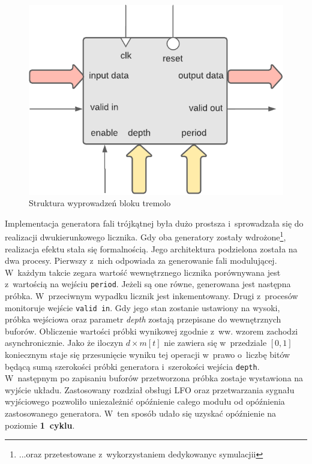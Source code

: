 \vspace{0.5cm}
\begin{figure}[ht]
    \centering
    \includegraphics[scale=0.75]{img/diagrams/tremolo.pdf}
    \captionsetup{format=plain,justification=centering}
    \caption{Struktura wyprowadzeń bloku tremolo}
    \label{tremolo-structure}
\end{figure}
\vspace{0.5cm}

Implementacja generatora fali trójkątnej była dużo prostsza i~sprowadzała się do realizacji dwukierunkowego licznika. Gdy oba generatory zostały wdrożone\footnote{...oraz przetestowane z~wykorzystaniem dedykowanyc symulacjii}, realizacja efektu stała się formalnością. Jego architektura podzielona została na dwa procesy. Pierwszy z~nich odpowiada za generowanie fali modulującej. W~każdym takcie zegara wartość wewnętrznego licznika porównywana jest z~wartością na wejściu \verb|period|. Jeżeli są one równe, generowana jest następna próbka. W~przeciwnym wypadku licznik jest inkementowany. Drugi z~procesów monitoruje wejście \verb|valid in|. Gdy jego stan zostanie ustawiony na wysoki, próbka wejściowa oraz parametr \textit{depth} zostają przepisane do wewnętrznych buforów. Obliczenie wartości próbki wynikowej zgodnie z~ww. wzorem zachodzi asynchronicznie. Jako że iloczyn $d \times m[t]$ nie zawiera się w~przedziale $[0,1]$ koniecznym staje się przesunięcie wyniku tej operacji w~prawo o~liczbę bitów będącą sumą szerokości próbki generatora i~szerokości wejścia \verb|depth|. W~następnym po zapisaniu buforów przetworzona próbka zostaje wystawiona na wyjście układu. Zastosowany rozdział obsługi LFO oraz przetwarzania sygnału wyjściowego pozwoliło uniezależnić opóźnienie całego modułu od opóźnienia zastosowanego generatora. W~ten sposób udało się uzyskać opóźnienie na poziomie \textbf{1~cyklu}.


